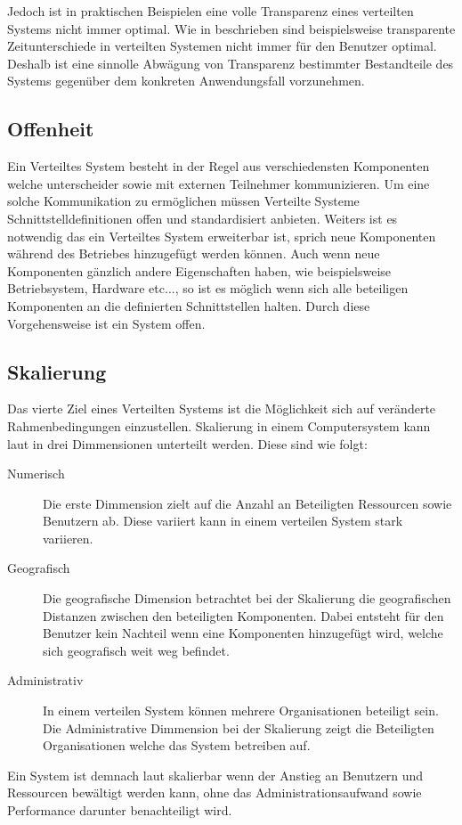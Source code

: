 Jedoch ist in praktischen Beispielen eine volle Transparenz eines verteilten Systems nicht immer optimal. Wie in \cite{tanenbaum2007distributed} beschrieben sind beispielsweise transparente Zeitunterschiede in verteilten Systemen nicht immer für den Benutzer optimal. Deshalb ist eine sinnolle Abwägung von Transparenz bestimmter Bestandteile des Systems gegenüber dem konkreten Anwendungsfall vorzunehmen. 

\subsection{Offenheit}\label{sec:distributedSystems:goales:openness} 
Ein Verteiltes System besteht in der Regel aus verschiedensten Komponenten welche unterscheider sowie mit externen Teilnehmer kommunizieren. Um eine solche Kommunikation zu ermöglichen müssen Verteilte Systeme Schnittstelldefinitionen offen und standardisiert anbieten. Weiters ist es notwendig das ein Verteiltes System erweiterbar ist, sprich neue Komponenten während des Betriebes hinzugefügt werden können. Auch wenn neue Komponenten gänzlich andere Eigenschaften haben, wie beispielsweise Betriebsystem, Hardware etc..., so ist es möglich wenn sich alle beteiligen Komponenten an die definierten Schnittstellen halten. Durch diese Vorgehensweise ist ein System offen.  

\subsection{Skalierung}\label{sec:distributedSystems:goales:scalability} 
Das vierte Ziel eines Verteilten Systems ist die Möglichkeit sich auf veränderte Rahmenbedingungen einzustellen. Skalierung in einem Computersystem kann laut \cite{Neuman1993Scale} in drei Dimmensionen unterteilt werden. Diese sind wie folgt: 
\begin{description}
    \item[Numerisch] Die erste Dimmension zielt auf die Anzahl an Beteiligten Ressourcen sowie Benutzern ab. Diese variiert kann in einem verteilen System stark variieren.
    \item[Geografisch] Die geografische Dimension betrachtet bei der Skalierung die geografischen Distanzen zwischen den beteiligten Komponenten. Dabei entsteht für den Benutzer kein Nachteil wenn eine Komponenten hinzugefügt wird, welche sich geografisch weit weg befindet.
    \item[Administrativ] In einem verteilen System können mehrere Organisationen beteiligt sein. Die Administrative Dimmension bei der Skalierung zeigt die Beteiligten Organisationen welche das System betreiben auf.
\end{description}
Ein System ist demnach laut \cite{Neuman1993Scale} skalierbar wenn der Anstieg an Benutzern und Ressourcen bewältigt werden kann, ohne das Administrationsaufwand sowie Performance darunter benachteiligt wird. \\

